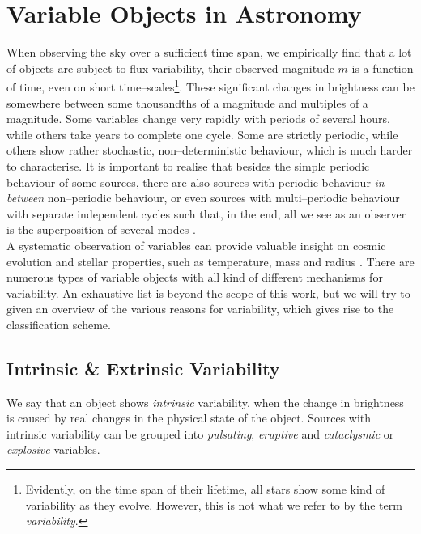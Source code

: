 \section{Variable Objects in Astronomy}
\label{sec:theory-variable-objects}

When observing the sky over a sufficient time span, we empirically find that a lot of objects are subject to flux variability, \ie their observed magnitude $m$ is a function of time, even on short time--scales\footnote{Evidently, on the time span of their lifetime, all stars show some kind of variability as they evolve. However, this is not what we refer to by the term \emph{variability}.}. These significant changes in brightness can be somewhere between some thousandths of a magnitude and multiples of a magnitude. Some variables change very rapidly with periods of several hours, while others take years to complete one cycle. Some are strictly periodic, while others show rather stochastic, non--deterministic behaviour, which is much harder to characterise. It is important to realise that besides the simple periodic behaviour of some sources, there are also sources with periodic behaviour \emph{in--between} non--periodic behaviour, or even sources with multi--periodic behaviour with separate independent cycles such that, in the end, all we see as an observer is the superposition of several modes \citep{hanslmeier2007}.\\

A systematic observation of variables can provide valuable insight on cosmic evolution and stellar properties, such as temperature, mass and radius \citep{percy2007}. There are numerous types of variable objects with all kind of different mechanisms for variability. An exhaustive list is beyond the scope of this work, but we will try to given an overview of the various reasons for variability, which gives rise to the classification scheme.

\subsection{Intrinsic \& Extrinsic Variability}
\label{subsec:intrinsic-extrinsic-variability}

We say that an object shows \emph{intrinsic} variability, when the change in brightness is caused by real changes in the physical state of the object. Sources with intrinsic variability can be grouped into \emph{pulsating}, \emph{eruptive} and \emph{cataclysmic} or \emph{explosive} variables.

